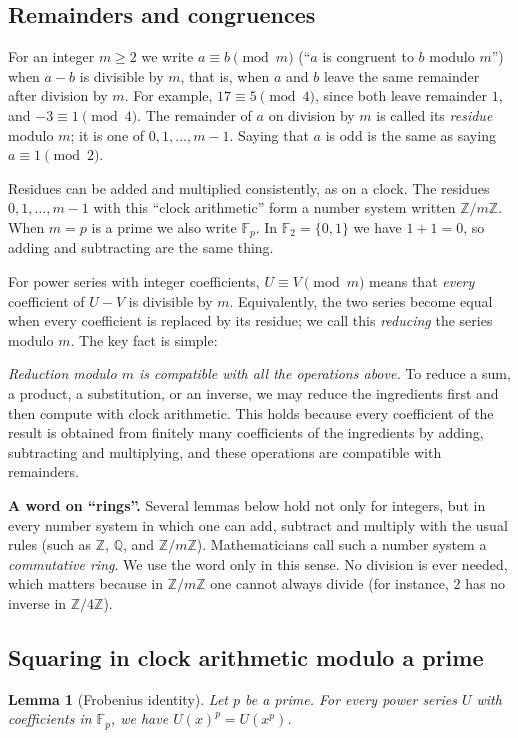 \documentclass[11pt,a4paper]{article}
\newtheorem{lemma}[theorem]{Lemma}
\theoremstyle{definition}
\theoremstyle{remark}
\newcommand{\Z}{\mathbb{Z}}
\newcommand{\Q}{\mathbb{Q}}
\newcommand{\F}{\mathbb{F}}
\newcommand{\para}[1]{\par\medskip\noindent\textbf{#1}\enspace}
\begin{document}
\subsection{Remainders and congruences}
For an integer $m\ge2$ we write $a\equiv b\pmod m$ (``$a$ is congruent to $b$ modulo $m$'') when $a-b$ is divisible by
$m$, that is, when $a$ and $b$ leave the same remainder after division by $m$. For example, $17\equiv5\pmod 4$, since both leave remainder $1$, and $-3\equiv1\pmod4$. The
remainder of $a$ on division by $m$ is called its \emph{residue} modulo $m$; it is one of $0,1,\dots,m-1$. Saying that
$a$ is odd is the same as saying $a\equiv1\pmod2$.

Residues can be added and multiplied consistently, as on a clock. The residues $0,1,\dots,m-1$ with this ``clock
arithmetic'' form a number system written $\Z/m\Z$. When $m=p$ is a prime we also write $\F_p$. In $\F_2=\{0,1\}$ we
have $1+1=0$, so adding and subtracting are the same thing.

For power series with integer coefficients, $U\equiv V\pmod m$ means that \emph{every} coefficient of $U-V$ is
divisible by $m$. Equivalently, the two series become equal when every coefficient is replaced by its residue; we call
this \emph{reducing} the series modulo $m$. The key fact is simple:

\emph{Reduction modulo $m$ is compatible with all the operations above.} To reduce a sum, a product, a substitution, or
an inverse, we may reduce the ingredients first and then compute with clock arithmetic. This holds because every
coefficient of the result is obtained from finitely many coefficients of the ingredients by adding, subtracting and
multiplying, and these operations are compatible with remainders.

\para{A word on ``rings''.} Several lemmas below hold not only for integers, but in every number system in
which one can add, subtract and multiply with the usual rules (such as $\Z$, $\Q$, and $\Z/m\Z$). Mathematicians call
such a number system a \emph{commutative ring}. We use the word only in this sense. No division is ever needed, which
matters because in $\Z/m\Z$ one cannot always divide (for instance, $2$ has no inverse in $\Z/4\Z$).

\subsection{Squaring in clock arithmetic modulo a prime}
\begin{lemma}[Frobenius identity]\label{lem:frobenius}
Let $p$ be a prime. For every power series $U$ with coefficients in $\F_p$, we have $U(x)^p=U(x^p)$.
\end{lemma}
\end{document}
